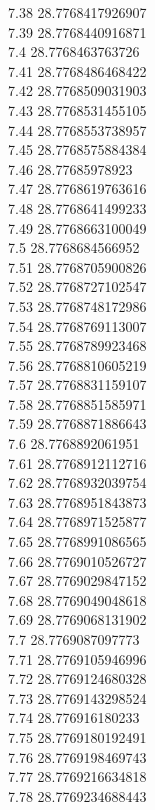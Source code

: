 {7.38	28.7768417926907\\
7.39	28.7768440916871\\
7.4	28.7768463763726\\
7.41	28.7768486468422\\
7.42	28.7768509031903\\
7.43	28.7768531455105\\
7.44	28.7768553738957\\
7.45	28.7768575884384\\
7.46	28.77685978923\\
7.47	28.7768619763616\\
7.48	28.7768641499233\\
7.49	28.7768663100049\\
7.5	28.7768684566952\\
7.51	28.7768705900826\\
7.52	28.7768727102547\\
7.53	28.7768748172986\\
7.54	28.7768769113007\\
7.55	28.7768789923468\\
7.56	28.7768810605219\\
7.57	28.7768831159107\\
7.58	28.7768851585971\\
7.59	28.7768871886643\\
7.6	28.7768892061951\\
7.61	28.7768912112716\\
7.62	28.7768932039754\\
7.63	28.7768951843873\\
7.64	28.7768971525877\\
7.65	28.7768991086565\\
7.66	28.7769010526727\\
7.67	28.7769029847152\\
7.68	28.7769049048618\\
7.69	28.7769068131902\\
7.7	28.7769087097773\\
7.71	28.7769105946996\\
7.72	28.7769124680328\\
7.73	28.7769143298524\\
7.74	28.776916180233\\
7.75	28.7769180192491\\
7.76	28.7769198469743\\
7.77	28.7769216634818\\
7.78	28.7769234688443\\
}
